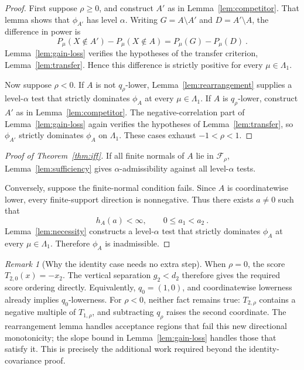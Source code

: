 \documentclass[12pt]{article}
\theoremstyle{remark}
\newtheorem{remark}{Remark}
\begin{document}
\begin{proof}
First suppose $\rho\ge0$, and construct $A'$ as in
Lemma~\ref{lem:competitor}.  That lemma shows that $\phi_{A'}$ has level
$\alpha$.  Writing $G=A\setminus A'$ and $D=A'\setminus A$, the difference in
power is
\[
P_\mu(X\notin A')-P_\mu(X\notin A)
=P_\mu(G)-P_\mu(D)~.
\]
Lemma~\ref{lem:gain-loss} verifies the hypotheses of the transfer criterion,
Lemma~\ref{lem:transfer}.  Hence this difference is strictly positive for
every $\mu\in\Lambda_1$.

Now suppose $\rho<0$.  If $A$ is not $q_\rho$-lower,
Lemma~\ref{lem:rearrangement} supplies a level-$\alpha$ test that strictly
dominates $\phi_A$ at every $\mu\in\Lambda_1$.  If $A$ is $q_\rho$-lower,
construct $A'$ as in Lemma~\ref{lem:competitor}.  The negative-correlation
part of Lemma~\ref{lem:gain-loss} again verifies the hypotheses of
Lemma~\ref{lem:transfer}, so $\phi_{A'}$ strictly dominates $\phi_A$ on
$\Lambda_1$.  These cases exhaust $-1<\rho<1$.
\end{proof}

\begin{proof}[Proof of Theorem~\ref{thm:iff}]
If all finite normals of $A$ lie in $\mathcal F_\rho$,
Lemma~\ref{lem:sufficiency} gives $\alpha$-admissibility against all
level-$\alpha$ tests.

Conversely, suppose the finite-normal condition fails.  Since $A$ is
coordinatewise lower, every finite-support direction is nonnegative.  Thus
there exists $a\ne0$ such that
\[
h_A(a)<\infty,
\qquad
0\le a_1<a_2~.
\]
Lemma~\ref{lem:necessity} constructs a level-$\alpha$ test that strictly
dominates $\phi_A$ at every $\mu\in\Lambda_1$.  Therefore $\phi_A$ is
inadmissible.
\end{proof}

\begin{remark}[Why the identity case needs no extra step]
When $\rho=0$, the score $T_{2,0}(x)=-x_2$.  The vertical separation
$g_2<d_2$ therefore gives the required score ordering directly.  Equivalently,
$q_0=(1,0)$, and coordinatewise lowerness already implies $q_0$-lowerness.
For $\rho<0$, neither fact remains true: $T_{2,\rho}$ contains a negative
multiple of $T_{1,\rho}$, and subtracting $q_\rho$ raises the second
coordinate.  The rearrangement lemma handles acceptance regions that fail
this new directional monotonicity; the slope bound in
Lemma~\ref{lem:gain-loss} handles those that satisfy it.  This is precisely
the additional work required beyond the identity-covariance proof.
\end{remark}
\end{document}
